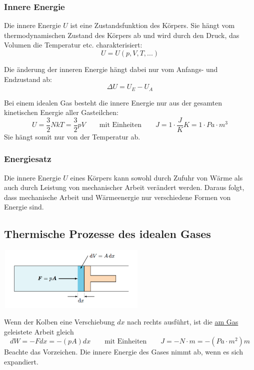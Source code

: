 \documentclass[11pt]{article}
\begin{document}
\subsubsection{Innere Energie}
Die innere Energie $U$ ist eine Zustandsfunktion des K{\"o}rpers. Sie h{\"a}ngt vom thermodynamischen Zustand des K{\"o}rpers ab und wird durch den Druck, das Volumen die Temperatur etc. charakterisiert:
\begin{equation*}
	U = U(p, V, T,...)
\end{equation*}

Die {\"a}nderung der inneren Energie h{\"a}ngt dabei nur vom Anfangs- und Endzustand ab:
\begin{equation*}
	\Delta U = U_E - U_A
\end{equation*}

Bei einem idealen Gas besteht die innere Energie nur aus der gesamten kinetischen Energie aller Gasteilchen:
\begin{equation*}
	U = \frac{3}{2}NkT = \frac{3}{2}pV \qquad\text{mit Einheiten}\qquad J = 1 \cdot \frac{J}{K} K = 1 \cdot Pa \cdot m^3
\end{equation*}
Sie h{\"a}ngt somit nur von der Temperatur ab.

\subsubsection{Energiesatz}
Die innere Energie $U$ eines K{\"o}rpers kann sowohl durch Zufuhr von W{\"a}rme als auch durch Leistung von mechanischer Arbeit ver{\"a}ndert werden. Daraus folgt, dass mechanische Arbeit und W{\"a}rmeenergie nur verschiedene Formen von Energie sind.

\subsection{Thermische Prozesse des idealen Gases}

\begin{center}
	\includegraphics[width=200pt]{images/kolben}
\end{center}

Wenn der Kolben eine Verschiebung $dx$ nach rechts ausf{\"u}hrt, ist die \underline{am Gas} geleistete Arbeit gleich
\begin{equation*}
	dW = -Fdx = -(pA)dx \qquad\text{mit Einheiten}\qquad	 J = -N\cdot m = -(Pa\cdot m^2)m
\end{equation*}
Beachte das Vorzeichen. Die innere Energie des Gases nimmt ab, wenn es sich expandiert. \newline
\end{document}
